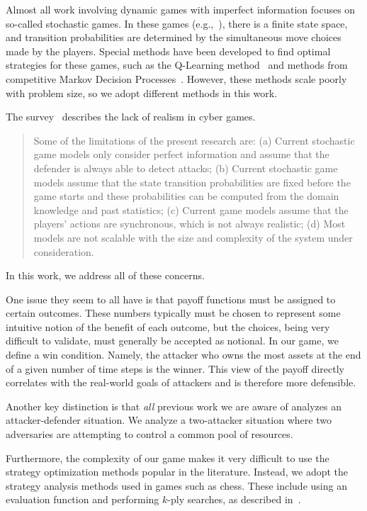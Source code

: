 Almost all work involving dynamic games with imperfect information
focuses on so-called stochastic games. In these games
(e.g.,~\cite{alpcan2006intrusion, lye2005game, xiaolin2008markov,
  sallhammar2006stochastic, nguyen2009stochastic}), there is a finite
state space, and transition probabilities are determined by the
simultaneous move choices made by the players. Special methods have
been developed to find optimal strategies for these games, such as the
Q-Learning method~\cite{hu2003nash} and methods from competitive
Markov Decision Processes~\cite{filar2012competitive}. However, these
methods scale poorly with problem size, so we adopt different methods
in this work.

The survey~\cite{roy2010survey} describes the lack of realism in cyber
games.
\begin{quote}
  Some of the limitations of the present research are: (a) Current
  stochastic game models only consider perfect information and
  assume that the defender is always able to detect attacks; (b)
  Current stochastic game models assume that the state transition
  probabilities are fixed before the game starts and these
  probabilities can be computed from the domain knowledge and past
  statistics; (c) Current game models assume that the players' actions
  are synchronous, which is not always realistic; (d) Most models are
  not scalable with the size and complexity of the system under
  consideration.
\end{quote}
In this work, we address all of these concerns.

One issue they seem to all have is that payoff functions must be
assigned to certain outcomes. These numbers typically must be chosen
to represent some intuitive notion of the benefit of each outcome, but
the choices, being very difficult to validate, must generally be
accepted as notional. In our game, we define a win condition. Namely,
the attacker who owns the most assets at the end of a given number of
time steps is the winner. This view of the payoff directly correlates
with the real-world goals of attackers and is therefore more
defensible.

Another key distinction is that {\em all} previous work we are aware
of analyzes an attacker-defender situation. We analyze a two-attacker
situation where two adversaries are attempting to control a common
pool of resources.

Furthermore, the complexity of our game makes it very difficult to use
the strategy optimization methods popular in the literature. Instead,
we adopt the strategy analysis methods used in games such as
chess. These include using an evaluation function and performing
$k$-ply searches, as described in~\cite{levy2009computer}.




